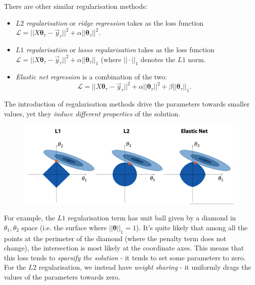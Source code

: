 There are other similar regularisation methods:
\begin{itemize}
\item \textit{$L2$ regularisation} or \textit{ridge regression} takes as the loss function $\mathcal{L} = ||X \pmb{\theta}_{\tau} - \vec{y}_{\tau}||^2 + \alpha || \pmb{\theta}_{\tau}||^2$.
\item \textit{$L1$ regularisation} or \textit{lasso regularisation} takes as the loss function $\mathcal{L} = ||X \pmb{\theta}_{\tau} - \vec{y}_{\tau}||^2 + \alpha||\pmb{\theta}_{\tau}||_1$ (where $|| \cdot ||_1$ denotes the $L1$ norm.
\item \textit{Elastic net regression} is a combination of the two:
\begin{equation*}
\mathcal{L} = ||X\pmb{\theta}_{\tau} - \vec{y}_{\tau}||^2 + \alpha || \pmb{\theta}_{\tau}||^2 + \beta || \pmb{\theta}_{\tau}||_{1}.
\end{equation*}
\end{itemize}

The introduction of regularisation methods drive the parameters towards smaller values, yet they \textit{induce different properties} of the solution.

\begin{figure}[H]
\centering
\includegraphics[scale=0.4]{diffregularisations.png}
\end{figure}


\newpage
For example, the $L1$ regularisation term has unit ball given by a diamond in $\theta_1, \theta_2$ space (i.e. the surface where $||\pmb{\theta}||_{1} = 1$). It's quite likely that among all the points at the perimeter of the diamond (where the penalty term does not change), the intersection is most likely at the coordinate axes. This means that this loss tends to \textit{sparsify the solution} - it tends to set some parameters to zero.\\

For the $L2$ regularisation, we instead have \textit{weight sharing} - it uniformly drags the values of the parameters towards zero.\\

